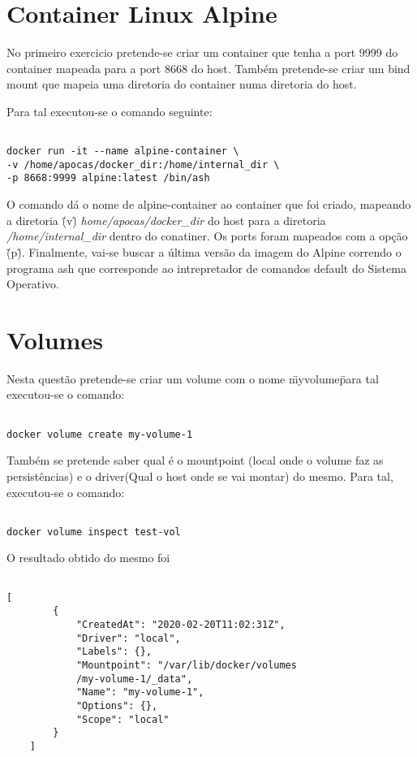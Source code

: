 \section{Container Linux Alpine}

No primeiro exercicio pretende-se criar um container que tenha a port 9999 do container mapeada para a port 8668 do host. Também pretende-se criar um bind mount que mapeia uma diretoria do container numa diretoria do host.

Para tal executou-se o comando seguinte:

\begin{lstlisting}

docker run -it --name alpine-container \
-v /home/apocas/docker_dir:/home/internal_dir \
-p 8668:9999 alpine:latest /bin/ash

\end{lstlisting}

O comando dá o nome de alpine-container ao container que foi criado, mapeando a diretoria (\"\-v\") \emph{home/apocas/docker\_dir} do host para a diretoria \emph{/home/internal\_dir} dentro do conatiner. Os ports foram mapeados com a opção (\"\-p\"). Finalmente, vai-se buscar a última versão da imagem do Alpine correndo o programa ash que corresponde ao intrepretador de comandos default do Sistema Operativo.

\section{Volumes}

Nesta questão pretende-se criar um volume com o nome \"my\-volume\" para tal executou-se o comando:

\begin{lstlisting}

docker volume create my-volume-1

\end{lstlisting}

Também se pretende saber qual é o mountpoint (local onde o volume faz as persistências) e o driver(Qual o host onde se vai montar) do mesmo. Para tal, executou-se o comando:

\begin{lstlisting}

docker volume inspect test-vol

\end{lstlisting}

O resultado obtido do mesmo foi

\begin{lstlisting}

[
    	{
        	"CreatedAt": "2020-02-20T11:02:31Z",
        	"Driver": "local",
        	"Labels": {},
        	"Mountpoint": "/var/lib/docker/volumes
        	/my-volume-1/_data",
        	"Name": "my-volume-1",
        	"Options": {},
        	"Scope": "local"
    	}
	]


\end{lstlisting}

